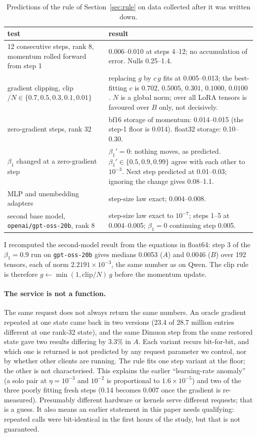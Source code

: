 \documentclass[11pt]{article}
\begin{document}
\begin{table}[h]\centering\small
\begin{tabular}{p{4.3cm}p{9.2cm}}\toprule
test & result\\\midrule
12 consecutive steps, rank 8, momentum rolled forward from step 1 & 0.006--0.010 at steps
4--12; no accumulation of error. Nulls 0.25--1.4.\\
gradient clipping, clip$/N\in\{0.7,0.5,0.3,0.1,0.01\}$ & replacing $g$ by $c\,g$ fits at
0.005--0.013; the best-fitting $c$ is $0.702,\,0.5005,\,0.301,\,0.1000,\,0.0100$. $N$ is a
global norm; over all LoRA tensors is favoured over $B$ only, not decisively.\\
zero-gradient steps, rank 32 & bf16 storage of momentum: 0.014--0.015 (the step-1 floor is
0.014). float32 storage: 0.10--0.30. \\
$\beta_1$ changed at a zero-gradient step & $\beta_1'=0$: nothing moves, as predicted.
$\beta_1'\in\{0.5,0.9,0.99\}$ agree with each other to $10^{-3}$. Next step predicted at
0.01--0.03; ignoring the change gives 0.08--1.1.\\
MLP and unembedding adapters & step-size law exact; 0.004--0.008.\\
second base model, \texttt{openai/gpt-oss-20b}, rank 8 & step-size law exact to $10^{-7}$;
steps 1--5 at 0.004--0.005; $\beta_1=0$ continuing step 0.005.\\\bottomrule
\end{tabular}
\caption{Predictions of the rule of Section~\ref{sec:rule} on data collected after it was
written down.}
\end{table}

I recomputed the second-model result from the equations in float64: step 3 of the
$\beta_1=0.9$ run on \texttt{gpt-oss-20b} gives medians 0.0053 ($A$) and 0.0046 ($B$) over 192
tensors, each of norm $2.2191\times10^{-3}$, the same number as on Qwen. The clip rule is
therefore $g\leftarrow\min(1,\mathrm{clip}/N)\,g$ before the momentum update.

\paragraph{The service is not a function.} The same request does not always return the same
numbers. An oracle gradient repeated at one state came back in two versions (23.4 of 28.7
million entries different at one rank-32 state), and the same Dimuon step from the same
restored state gave two results differing by 3.3\% in $A$. Each variant recurs bit-for-bit, and
which one is returned is not predicted by any request parameter we control, nor by whether
other clients are running. The rule fits one step variant at the floor; the other is not
characterised. This explains the earlier ``learning-rate anomaly'' (a solo pair at
$\eta=10^{-3}$ and $10^{-2}$ is proportional to $1.6\times10^{-5}$) and two of the three
poorly fitting fresh steps (0.14 becomes 0.007 once the gradient is re-measured). Presumably
different hardware or kernels serve different requests; that is a guess. It also means an
earlier statement in this paper needs qualifying: repeated calls were bit-identical in the
first hours of the study, but that is not guaranteed.
\end{document}
